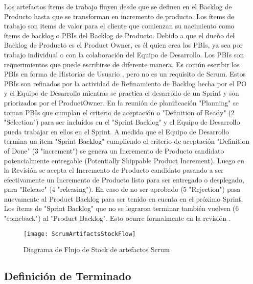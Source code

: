 Los artefactos ítems de trabajo fluyen desde que se definen en el Backlog de Producto hasta que se transforman en incremento de producto. Los ítems de trabajo son items de valor para el cliente que comienzan su nacimiento como ítems de backlog o PBIs del Backlog de Producto. Debido a que el dueño del Backlog de Producto es el Product Owner, es él quien crea los PBIs, ya sea por trabajo individual o con la colaboración del Equipo de Desarrollo. Los PBIs son requerimientos que puede escribirse de diferente manera. Es común escribir los PBIs en forma de Historias de Usuario \cite{Cohn-2004}, pero no es un requisito de Scrum. Estos PBIs son refinados por la actividad de Refinamiento de Backlog hecha por el PO y el Equipo de Desarrollo mientras se practica el desarrollo de un Sprint y son priorizados por el ProductOwner. En la reunión de planificación "Planning" se toman PBIs que cumplan el criterio de aceptación o "Definition of Ready" (2 "Selection") para ser incluidos en el "Sprint Backlog" y el Equipo de Desarrollo pueda trabajar en ellos en el Sprint. A medida que el Equipo de Desarrollo termina un ítem "Sprint Backlog" cumpliendo el criterio de aceptación "Definition of Done" (3 "increment") se genera un Incremento de Producto candidato potencialmente entregable (Potentially Shippable Product Increment). Luego en la Revisión se acepta el Incremento de Producto candidato pasando a ser efectivamente un Incremento de Producto listo para ser entregado o desplegado, para "Release" (4 "releasing"). En caso de no ser aprobado (5 "Rejection") pasa nuevamente al Product Backlog para ser tenido en cuenta en el próximo Sprint. Los ítems de "Sprint Backlog" que no se lograron terminar también vuelven (6 "comeback") al "Product Backlog". Esto ocurre formalmente en la revisión \cite{Martin-Alaimo-2014}.

\begin{figure}[h]
  \centering
  \texttt{[image: ScrumArtifactsStockFlow]}
  \caption{Diagrama de Flujo de Stock de artefactos Scrum}
  \centering
  \label{fig:ScrumArtifactsStockFlow} 
\end{figure}
\FloatBarrier

\subsection{Definición de Terminado}

